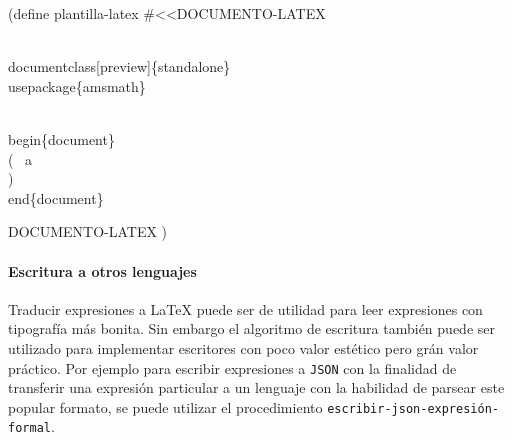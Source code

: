 \documentclass[10pt,oneside,openany,letterpaper]{book}
\begin{document}
\nwenddocs{}\plusendmoddef
(define plantilla-latex
#<<DOCUMENTO-LATEX
  
\\documentclass[preview]\{standalone\}
\\usepackage\{amsmath\}

\\begin\{document\}
\\( ~a \\)
\\end\{document\}

DOCUMENTO-LATEX
  )
\eatline
{}\nwendcode{}\nwdocspar
\paragraph{Escritura a otros lenguajes} Traducir expresiones a \LaTeX{} puede ser de utilidad para leer expresiones con tipografía más bonita. Sin embargo el algoritmo de escritura también puede ser utilizado para implementar escritores con poco valor estético pero grán valor práctico. Por ejemplo para escribir expresiones a {\tt{}JSON} con la finalidad de transferir una expresión particular a un lenguaje con la habilidad de parsear este popular formato, se puede utilizar el procedimiento {\tt{}\protect{}escribir-json-expresión-formal}.
\end{document}
